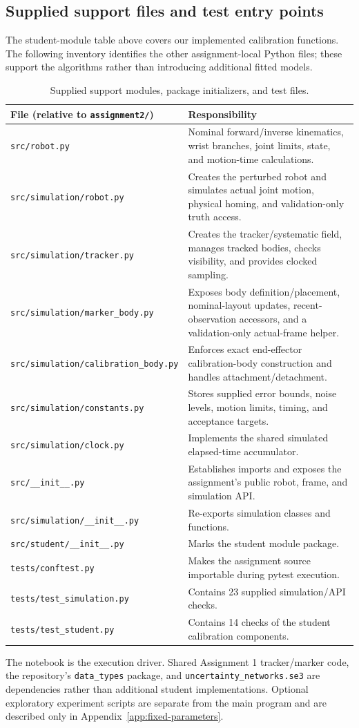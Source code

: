 \documentclass[11pt]{article}
\begin{document}
\subsection{Supplied support files and test entry points}
The student-module table above covers our implemented calibration functions. The following inventory identifies the other assignment-local Python files; these support the algorithms rather than introducing additional fitted models.
\begin{table}[H]\centering\small
\caption{Supplied support modules, package initializers, and test files.}
\begin{tabularx}{\linewidth}{@{}p{.39\linewidth}Y@{}}\toprule
File (relative to \texttt{assignment2/}) & Responsibility\\\midrule
\texttt{src/robot.py} & Nominal forward/inverse kinematics, wrist branches, joint limits, state, and motion-time calculations.\\
\texttt{src/simulation/robot.py} & Creates the perturbed robot and simulates actual joint motion, physical homing, and validation-only truth access.\\
\texttt{src/simulation/tracker.py} & Creates the tracker/systematic field, manages tracked bodies, checks visibility, and provides clocked sampling.\\
\texttt{src/simulation/marker\_body.py} & Exposes body definition/placement, nominal-layout updates, recent-observation accessors, and a validation-only actual-frame helper.\\
\texttt{src/simulation/calibration\_body.py} & Enforces exact end-effector calibration-body construction and handles attachment/detachment.\\
\texttt{src/simulation/constants.py} & Stores supplied error bounds, noise levels, motion limits, timing, and acceptance targets.\\
\texttt{src/simulation/clock.py} & Implements the shared simulated elapsed-time accumulator.\\
\texttt{src/\_\_init\_\_.py} & Establishes imports and exposes the assignment's public robot, frame, and simulation API.\\
\texttt{src/simulation/\_\_init\_\_.py} & Re-exports simulation classes and functions.\\
\texttt{src/student/\_\_init\_\_.py} & Marks the student module package.\\
\texttt{tests/conftest.py} & Makes the assignment source importable during pytest execution.\\
\texttt{tests/test\_simulation.py} & Contains 23 supplied simulation/API checks.\\
\texttt{tests/test\_student.py} & Contains 14 checks of the student calibration components.\\\bottomrule
\end{tabularx}\end{table}
The notebook is the execution driver. Shared Assignment 1 tracker/marker code, the repository's \texttt{data\_types} package, and \texttt{uncertainty\_networks.se3} are dependencies rather than additional student implementations. Optional exploratory experiment scripts are separate from the main program and are described only in Appendix~\ref{app:fixed-parameters}.
\end{document}
